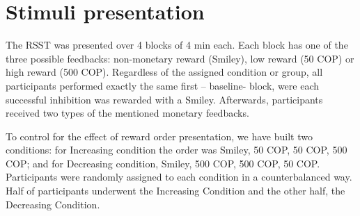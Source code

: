 \section{Stimuli presentation} 

The RSST was presented over 4 blocks of 4 min each. Each block has one of the three possible feedbacks: non-monetary reward (Smiley), low reward (50 COP) or high reward (500 COP). Regardless of the assigned condition or group, all participants performed exactly the same first – baseline- block, were each successful inhibition was rewarded with a Smiley. Afterwards, participants received two types of the mentioned monetary feedbacks.

To control for the effect of reward order presentation, we have built two conditions: for Increasing condition the order was Smiley, 50 COP, 50 COP, 500 COP; and for Decreasing condition, Smiley, 500 COP, 500 COP, 50 COP. Participants were randomly assigned to each condition in a counterbalanced way. Half of participants underwent the Increasing Condition and the other half, the Decreasing Condition.

